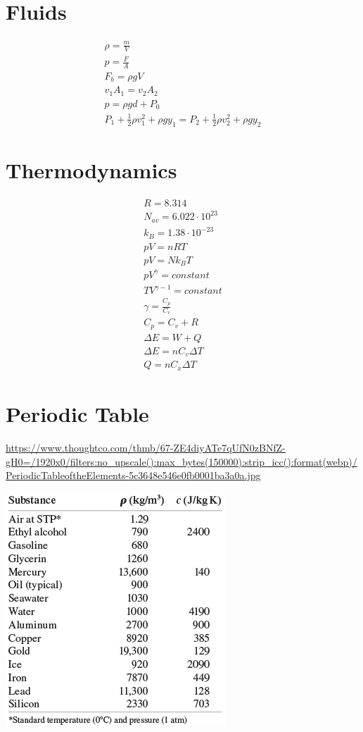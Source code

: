 \documentclass[12pt, letterpaper]{article}
\begin{document}
\section*{Fluids}
\begin{align}
  \rho = \frac{m}{V} \\
  p = \frac{F}{A} \\
  F_b = \rho g V \\
  v_1A_1 = v_2A_2 \\
  p = \rho gd + P_0 \\
  P_1 + \frac{1}{2}\rho v_1^2 + \rho g y_1 = P_2 + \frac{1}{2}\rho v_2^2 + \rho g y_2
\end{align}

\section*{Thermodynamics}
\begin{align}
  R = 8.314 \\
  N_{av} = 6.022 \cdot 10^{23} \\
  k_B = 1.38 \cdot 10^{-23} \\
  pV = nRT \\
  pV = Nk_BT \\
  pV^\gamma = constant \\
  TV^{\gamma - 1} = constant \\
  \gamma = \frac{C_p}{C_v} \\
  C_p = C_v + R \\
  \Delta E = W + Q \\
  \Delta E = nC_v\Delta T \\
  Q = nC_x\Delta T
\end{align}

\section*{Periodic Table}
\url{https://www.thoughtco.com/thmb/67-ZE4diyATe7qUfN0zBNfZ-gH0=/1920x0/filters:no_upscale():max_bytes(150000):strip_icc():format(webp)/PeriodicTableoftheElements-5c3648e546e0fb0001ba3a0a.jpg}

\includegraphics{densities}
\end{document}

